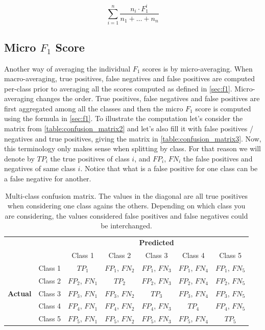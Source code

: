\begin{equation}
    \sum_{i=1}^n \frac{n_i \cdot F_1^i}{n_1 + \dots + n_n}
\end{equation}

\subsection{Micro $F_1$ Score}\label{sec:micro}

Another way of averaging the individual $F_1$ scores is by micro-averaging. When macro-averaging, true positives, false negatives and false positives are computed per-class prior to averaging all the scores computed as defined in \autoref{sec:f1}. Micro-averaging changes the order. True positives, false negatives and false positives are first aggregated among all the classes and then the micro $F_1$ score is computed using the formula in \autoref{sec:f1}. To illustrate the computation let's consider the matrix from \autoref{table:confusion_matrix2} and let's also fill it with false positives / negatives and true positives, giving the matrix in \autoref{table:confusion_matrix3}. Now, this terminology only makes sense when splitting by class. For that reason we will denote by $TP_i$ the true positives of class $i$, and $FP_i$, $FN_i$ the false positives and negatives of same class $i$. Notice that what is a false positive for one class can be a false negative for another.

\begin{table}[ht]
\centering
\caption{Multi-class confusion matrix. The values in the diagonal are all true positives when considering one class agains the others. Depending on which class you are considering, the values considered false positives and false negatives could be interchanged.}
\begin{tabular}{c c c|c|c|c|c|}
& & \multicolumn{5}{c}{\textbf{Predicted}} \\ \cline{3-7}
& & \multicolumn{1}{|c|}{Class 1} & Class 2 & Class 3 & Class 4 & Class 5 \\ \cline{2-7}
\multirow{5}{*}{\textbf{Actual}} 
 & \multicolumn{1}{|c|}{Class 1} & $TP_1$ & $FP_1$, $FN_2$ & $FP_1$, $FN_3$ & $FP_1$, $FN_4$ & $FP_1$, $FN_5$ \\ \cline{2-7}
 & \multicolumn{1}{|c|}{Class 2} & $FP_2$, $FN_1$ & $TP_2$ & $FP_2$, $FN_3$ & $FP_2$, $FN_4$ & $FP_2$, $FN_5$ \\ \cline{2-7}
 & \multicolumn{1}{|c|}{Class 3} & $FP_3$, $FN_1$ & $FP_3$, $FN_2$ & $TP_3$ & $FP_3$, $FN_4$ & $FP_3$, $FN_5$ \\ \cline{2-7}
 & \multicolumn{1}{|c|}{Class 4} & $FP_4$, $FN_1$ & $FP_4$, $FN_2$ & $FP_4$, $FN_3$ & $TP_4$ & $FP_4$, $FN_5$ \\ \cline{2-7}
 & \multicolumn{1}{|c|}{Class 5} & $FP_5$, $FN_1$ & $FP_5$, $FN_2$ & $FP_5$, $FN_3$ & $FP_5$, $FN_4$ & $TP_5$ \\ \cline{2-7}
\end{tabular}
\label{table:confusion_matrix3}
\end{table}

